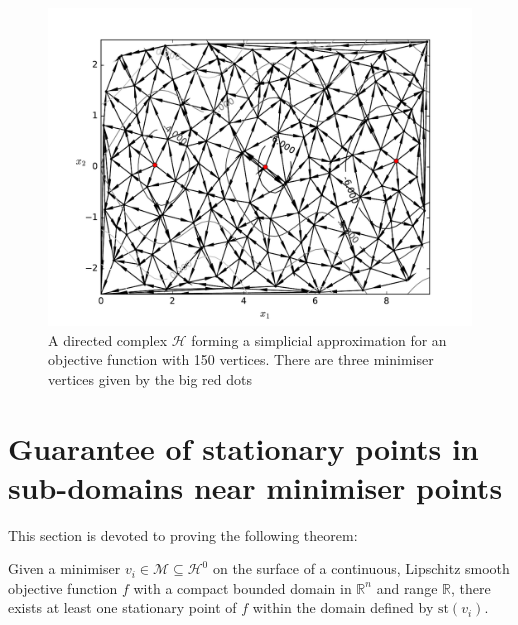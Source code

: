 \begin{figure} 
\centerline{\includegraphics[scale=0.65]{./Fig8.pdf}}
{\caption{A directed complex $\mathcal{H}$ forming a simplicial approximation for an objective function with 150 vertices. There are three minimiser vertices given by the big red dots} \label{fig:alp100}}
\end{figure}

\section{Guarantee of stationary points in sub-domains near minimiser points}
This section is devoted to proving the following theorem:
\begin{theorem} \label{theor:stat}
Given a minimiser $v_i \in \mathcal{M} \subseteq \mathcal{H}^0$ on the surface of a continuous, Lipschitz smooth objective function $f$ with a compact bounded domain in $\mathbb{R}^n$ and range $\mathbb{R}$, there exists at least one stationary point of $f$ within the domain defined by $\textrm{st}\left( v_i \right)$.
\end{theorem}

